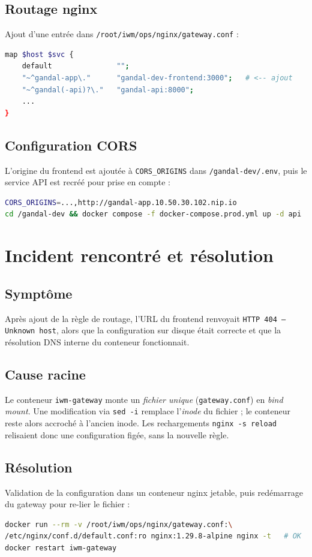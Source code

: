 \documentclass[11pt,a4paper]{article}
\begin{document}
\subsection{Routage nginx}
Ajout d'une entrée dans \texttt{/root/iwm/ops/nginx/gateway.conf} :
\begin{lstlisting}[language=bash]
map $host $svc {
    default               "";
    "~^gandal-app\."      "gandal-dev-frontend:3000";   # <-- ajout
    "~^gandal(-api)?\."   "gandal-api:8000";
    ...
}
\end{lstlisting}

\subsection{Configuration CORS}
\label{sec:cors}
L'origine du frontend est ajoutée à \texttt{CORS\_ORIGINS} dans
\texttt{/gandal-dev/.env}, puis le service API est recréé pour prise en compte :
\begin{lstlisting}[language=bash]
CORS_ORIGINS=...,http://gandal-app.10.50.30.102.nip.io
cd /gandal-dev && docker compose -f docker-compose.prod.yml up -d api
\end{lstlisting}

\section{Incident rencontré et résolution}

\subsection{Symptôme}
Après ajout de la règle de routage, l'URL du frontend renvoyait \texttt{HTTP 404 —
Unknown host}, alors que la configuration sur disque était correcte et que la
résolution DNS interne du conteneur fonctionnait.

\subsection{Cause racine}
Le conteneur \texttt{iwm-gateway} monte un \emph{fichier unique}
(\texttt{gateway.conf}) en \emph{bind mount}. Une modification via \texttt{sed -i}
remplace l'\emph{inode} du fichier ; le conteneur reste alors accroché à l'ancien
inode. Les rechargements \texttt{nginx -s reload} relisaient donc une configuration
figée, sans la nouvelle règle.

\subsection{Résolution}
Validation de la configuration dans un conteneur nginx jetable, puis redémarrage du
gateway pour re-lier le fichier :
\begin{lstlisting}[language=bash]
docker run --rm -v /root/iwm/ops/nginx/gateway.conf:\
/etc/nginx/conf.d/default.conf:ro nginx:1.29.8-alpine nginx -t   # OK
docker restart iwm-gateway
\end{lstlisting}
\end{document}
